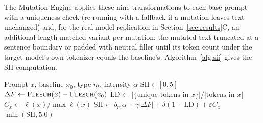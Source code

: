 \documentclass[conference]{IEEEtran}
\begin{document}
The Mutation Engine applies these nine transformations to each base
prompt with a uniqueness check (re-running with a fallback if a
mutation leaves text unchanged) and, for the real-model replication in
Section~\ref{sec:results}C, an additional length-matched variant per
mutation: the mutated text truncated at a sentence boundary or padded
with neutral filler until its token count under the target model's
own tokenizer equals the baseline's. Algorithm~\ref{alg:sii} gives the
SII computation.
\begin{algorithm}[t]
\caption{Semantic Instability Index}
\label{alg:sii}
\begin{algorithmic}[1]
\REQUIRE Prompt $x$, baseline $x_0$, type $m$, intensity $\alpha$
\ENSURE $\mathrm{SII}\in[0,5]$
\STATE $\Delta F \gets \textsc{Flesch}(x)-\textsc{Flesch}(x_0)$
\STATE $\mathrm{LD}\gets|\{\text{unique tokens in }x\}|/|\text{tokens in }x|$
\STATE $C_x\gets\bar\ell(x)/\max\ell(x)$ 
\STATE $\mathrm{SII}\gets b_m\alpha+\gamma|\Delta F|+\delta(1-\mathrm{LD})+\varepsilon C_x$
\RETURN $\min(\mathrm{SII},5.0)$
\end{algorithmic}
\end{algorithm}
\end{document}
